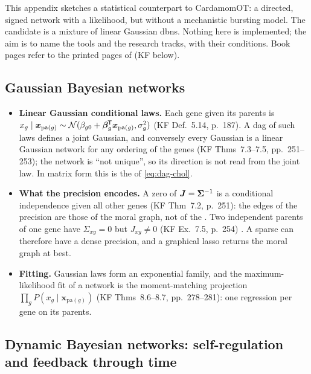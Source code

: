 \documentclass[11pt,a4paper]{article}
\begin{document}
This appendix sketches a statistical counterpart to CardamomOT: a directed, signed network with a
likelihood, but without a mechanistic bursting model. The candidate is a mixture of linear Gaussian
\glspl{dbn}. Nothing here is implemented; the aim is to name the tools and the research tracks, with their
conditions. Book pages refer to the printed pages of \textcite{kollerProbabilisticGraphicalModels2009} (KF below).

\subsection{Gaussian Bayesian networks}\label{app:gbn}

\begin{itemize}
  \item \textbf{Linear Gaussian conditional laws.} Each gene given its parents is
        $x_g\mid\bm x_{\mathrm{pa}(g)}\sim\mathcal N(\beta_{g0}+\bm\beta_g^{\mkern-1.5mu\mathsf{T}}\bm x_{\mathrm{pa}(g)},\sigma_g^2)$ (KF Def.~5.14,
        p.~187). A \gls{dag} of such laws defines a joint Gaussian, and conversely every Gaussian is a linear
        Gaussian network for any ordering of the genes (KF Thms~7.3--7.5, pp.~251--253); the network is
        \enquote{not unique}, so its direction is not read from the joint law. In matrix form this is the
         of \cref{eq:dag-chol}.
  \item \textbf{What the precision encodes.} A zero of $\bm J=\bm{\Sigma}^{-1}$ is a conditional independence given
        all other genes (KF Thm~7.2, p.~251): the edges of the precision are those of the moral graph, not of the
        . Two independent parents of one gene have $\Sigma_{xy}=0$ but $J_{xy}\neq0$ (KF Ex.~7.5,
        p.~254) . A sparse  can therefore have a dense precision, and a graphical lasso
        returns the moral graph at best.
  \item \textbf{Fitting.} Gaussian laws form an exponential family, and the maximum-likelihood fit of a network
        is the moment-matching projection $\prod_gP(x_g\mid\bm x_{\mathrm{pa}(g)})$ (KF Thms~8.6--8.7,
        pp.~278--281): one regression per gene on its parents.
\end{itemize}

\subsection{Dynamic Bayesian networks: self-regulation and feedback through time}\label{app:dbn}
\end{document}
